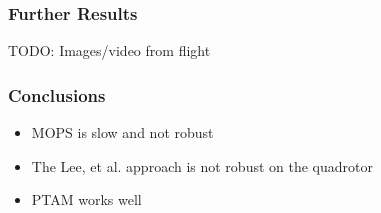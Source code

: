 \documentclass[xcolor=x11names,compress,t]{beamer}
\renewcommand{\(}{\begin{columns}}
\renewcommand{\)}{\end{columns}}
\newcommand{\<}[1]{\begin{column}{#1}}
\renewcommand{\>}{\end{column}}
\begin{document}
\begin{frame}
  \frametitle{Further Results}
  TODO: Images/video from flight
\end{frame}

\begin{frame}
  \frametitle{Conclusions}
  \begin{itemize}
  \item MOPS is slow and not robust
  \item The Lee, et al. approach is not robust on the quadrotor
  \item PTAM works well
  \end{itemize}
\end{frame}

\end{document}
